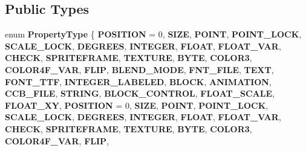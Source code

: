 \subsection*{Public Types}
\begin{DoxyCompactItemize}
\item 
\mbox{\label{classcocosbuilder_1_1CCBReader_af7c226328c6eb5932c3555efaf282eb9}} 
enum {\bfseries Property\+Type} \{ \newline
{\bfseries P\+O\+S\+I\+T\+I\+ON} = 0, 
{\bfseries S\+I\+ZE}, 
{\bfseries P\+O\+I\+NT}, 
{\bfseries P\+O\+I\+N\+T\+\_\+\+L\+O\+CK}, 
\newline
{\bfseries S\+C\+A\+L\+E\+\_\+\+L\+O\+CK}, 
{\bfseries D\+E\+G\+R\+E\+ES}, 
{\bfseries I\+N\+T\+E\+G\+ER}, 
{\bfseries F\+L\+O\+AT}, 
\newline
{\bfseries F\+L\+O\+A\+T\+\_\+\+V\+AR}, 
{\bfseries C\+H\+E\+CK}, 
{\bfseries S\+P\+R\+I\+T\+E\+F\+R\+A\+ME}, 
{\bfseries T\+E\+X\+T\+U\+RE}, 
\newline
{\bfseries B\+Y\+TE}, 
{\bfseries C\+O\+L\+O\+R3}, 
{\bfseries C\+O\+L\+O\+R4\+F\+\_\+\+V\+AR}, 
{\bfseries F\+L\+IP}, 
\newline
{\bfseries B\+L\+E\+N\+D\+\_\+\+M\+O\+DE}, 
{\bfseries F\+N\+T\+\_\+\+F\+I\+LE}, 
{\bfseries T\+E\+XT}, 
{\bfseries F\+O\+N\+T\+\_\+\+T\+TF}, 
\newline
{\bfseries I\+N\+T\+E\+G\+E\+R\+\_\+\+L\+A\+B\+E\+L\+ED}, 
{\bfseries B\+L\+O\+CK}, 
{\bfseries A\+N\+I\+M\+A\+T\+I\+ON}, 
{\bfseries C\+C\+B\+\_\+\+F\+I\+LE}, 
\newline
{\bfseries S\+T\+R\+I\+NG}, 
{\bfseries B\+L\+O\+C\+K\+\_\+\+C\+O\+N\+T\+R\+OL}, 
{\bfseries F\+L\+O\+A\+T\+\_\+\+S\+C\+A\+LE}, 
{\bfseries F\+L\+O\+A\+T\+\_\+\+XY}, 
\newline
{\bfseries P\+O\+S\+I\+T\+I\+ON} = 0, 
{\bfseries S\+I\+ZE}, 
{\bfseries P\+O\+I\+NT}, 
{\bfseries P\+O\+I\+N\+T\+\_\+\+L\+O\+CK}, 
\newline
{\bfseries S\+C\+A\+L\+E\+\_\+\+L\+O\+CK}, 
{\bfseries D\+E\+G\+R\+E\+ES}, 
{\bfseries I\+N\+T\+E\+G\+ER}, 
{\bfseries F\+L\+O\+AT}, 
\newline
{\bfseries F\+L\+O\+A\+T\+\_\+\+V\+AR}, 
{\bfseries C\+H\+E\+CK}, 
{\bfseries S\+P\+R\+I\+T\+E\+F\+R\+A\+ME}, 
{\bfseries T\+E\+X\+T\+U\+RE}, 
\newline
{\bfseries B\+Y\+TE}, 
{\bfseries C\+O\+L\+O\+R3}, 
{\bfseries C\+O\+L\+O\+R4\+F\+\_\+\+V\+AR}, 
{\bfseries F\+L\+IP}, 
\newline

\end{DoxyCompactItemize}
